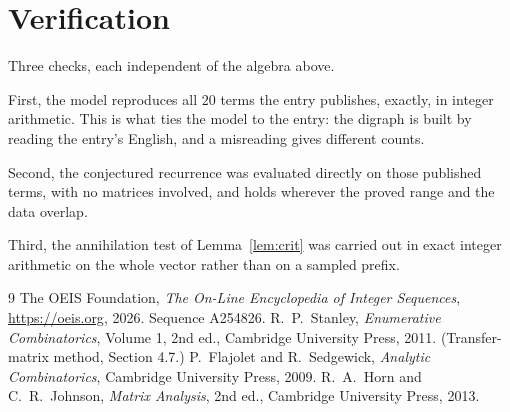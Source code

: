 \documentclass[11pt,a4paper]{article}
\theoremstyle{plain}
\theoremstyle{definition}
\begin{document}
\section{Verification}

Three checks, each independent of the algebra above.

First, the model reproduces all $20$ terms the entry publishes, exactly, in integer
arithmetic. This is what ties the model to the entry: the digraph is built by reading the
entry's English, and a misreading gives different counts.

Second, the conjectured recurrence was evaluated directly on those published terms, with no
matrices involved, and holds wherever the proved range and the data overlap.

Third, the annihilation test of Lemma~\ref{lem:crit} was carried out in exact integer
arithmetic on the whole vector rather than on a sampled prefix.

\begin{thebibliography}{9}
 The OEIS Foundation, \emph{The On-Line Encyclopedia of Integer
Sequences}, \url{https://oeis.org}, 2026. Sequence A254826.
 R.~P.~Stanley, \emph{Enumerative Combinatorics}, Volume 1, 2nd ed.,
Cambridge University Press, 2011. (Transfer-matrix method, Section 4.7.)
 P.~Flajolet and R.~Sedgewick, \emph{Analytic Combinatorics}, Cambridge
University Press, 2009.
 R.~A.~Horn and C.~R.~Johnson, \emph{Matrix Analysis}, 2nd ed., Cambridge
University Press, 2013.
\end{thebibliography}
\end{document}
